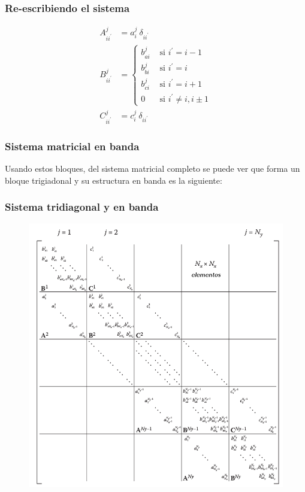 \begin{frame}
\frametitle{Re-escribiendo el sistema}
\begin{equation}
\begin{aligned}
A_{ii^{\prime}}^{j} &= a_{i}^{j} \: \delta_{ii^{\prime}} \\
B_{ii^{\prime}}^{j} &= \begin{cases}
b_{ai}^{j} & \mbox{ si } i^{\prime} = i-1 \\
b_{bi}^{j} & \mbox{ si } i^{\prime} = i \\
b_{ci}^{j} & \mbox{ si } i^{\prime} = i+1 \\
0 & \mbox{ si } i^{\prime} \neq i, i \pm 1 \end{cases} \\
C_{ii^{\prime}}^{j} &= c_{i}^{j} \: \delta_{ii^{\prime}}
\end{aligned}
\label{eq:ecuacion:13_16}
\end{equation}
\end{frame}
\begin{frame}
\frametitle{Sistema matricial en banda}
Usando estos bloques, del sistema matricial completo se puede ver que forma un bloque trigiadonal y su estructura en banda es la siguiente:
\end{frame}
{
\begin{frame}
\frametitle{Sistema tridiagonal y en banda}
\begin{figure}
	\centering
	\includegraphics[scale=0.27]{Imagenes/Sistema_Matricial_Completo.png}
\end{figure}    
\end{frame}
}
